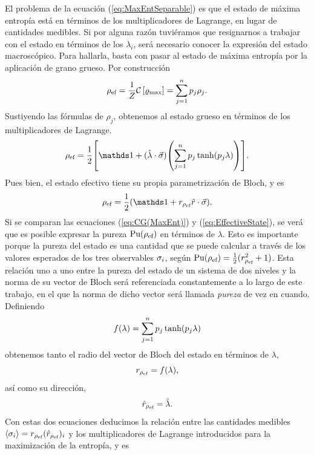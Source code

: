 El problema de la ecuación (\ref{eq:MaxEntSeparable}) es que el estado de máxima entropía está en términos de los multiplicadores de Lagrange, en lugar de cantidades medibles. Si por alguna razón tuviéramos que resignarnos a trabajar con el estado en términos de los $\lambda_{i}$, será necesario conocer la expresión del estado macroscópico. Para hallarla, basta con pasar al estado de máxima entropía por la aplicación de grano grueso. Por construcción 
\begin{equation*}
    \rho_{\text{ef}}=\frac{1}{Z}\mathcal{C}\left[\varrho_{\max}\right]=\sum_{j=1}^{n}p_{j}\rho_{j}.
\end{equation*}
Sustiyendo las fórmulas de $\rho_{j}$, obtenemos al estado grueso en términos de los multiplicadores de Lagrange.
\begin{equation}\label{eq:CG(MaxEnt)}
    \rho_{\ef}=\frac{1}{2}\qty[\Id+(\paulivec{\lambda})\qty(\sum_{j=1}^{n}p_{j}\tanh(p_{j}\lambda))].
\end{equation}
Pues bien, el estado efectivo tiene su propia parametrización de Bloch, y es
\begin{equation}\label{eq:EffectiveState}
    \rho_{\ef}=\frac{1}{2}(\Id+r_{\rho_{\ef}}\paulivec{r}).
\end{equation}
Si se comparan las ecuaciones (\ref*{eq:CG(MaxEnt)}) y (\ref*{eq:EffectiveState}), se verá que es posible expresar la pureza $\text{Pu}(\rho_{\text{ef}})$ en términos de $\lambda$. Esto es importante porque la pureza del estado es una cantidad que se puede calcular a través de los valores esperados de los tres observables $\sigma_{i}$, según $\text{Pu}(\rho_{\text{ef}})=\frac{1}{2}(r_{\rho_{\text{ef}}}^{2}+1)$. Esta relación uno a uno entre la pureza del estado de un sistema de dos niveles y la norma de su vector de Bloch será referenciada constantemente a lo largo de este trabajo, en el que la norma de dicho vector será llamada \textit{pureza} de vez en cuando. Definiendo
\begin{equation}\label{eq:r(lambda)}
    f(\lambda)=\sum_{j=1}^{n}p_{j}\tanh(p_{j}\lambda)
\end{equation}
obtenemos tanto el radio del vector de Bloch del estado en términos de $\lambda$,
\begin{equation*}
    r_{\rho_{\text{ef}}}=f(\lambda),
\end{equation*}
así como su dirección,
\begin{equation*}
    \hat{r}_{\rho_{\text{ef}}}=\hat{\lambda}.
\end{equation*}
Con estas dos ecuaciones deducimos la relación entre las cantidades medibles $\expval{\sigma_{i}}=r_{\rho_{\text{ef}}}(\hat{r}_{\rho_{\text{ef}}})_{i}$ y los multiplicadores de Lagrange introducidos para la maximización de la entropía, y es
